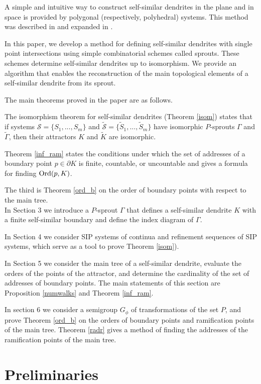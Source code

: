 \documentclass[11pt,reqno]{amsart}
\newcommand{\eS}{{\mathcal S}}
\begin{document}
A simple and intuitive way to construct self-similar dendrites in the plane and in space is provided by polygonal (respectively, polyhedral) systems.
This method was described in \cite{STV} and expanded in \cite{Adam}. 


In this paper, we develop a method for defining self-similar dendrites with single point intersections using simple combinatorial schemes called sprouts. These schemes determine self-similar dendrites up to isomorphism. We provide an algorithm that enables the reconstruction of the main topological elements of a self-similar dendrite from its sprout.


The main theorems proved in the paper are as follows.

The isomorphism theorem for self-similar dendrites (Theorem \ref{isom}) states that  if systems ${\eS}=\{S_1,...,S_m\}$ and $\tilde {\eS}=\{\tilde S_1,...,\tilde S_m\}$ have isomorphic $P$-sprouts $\Gamma$ and $\tilde \Gamma$, then their attractors $K$ and $ \tilde K$ are isomorphic. 

Theorem \ref{inf_ram} states the conditions under which  the  set of addresses of a boundary point $p\in \partial K$ is finite, countable, or uncountable and gives a formula for finding  ${\rm Ord}(p,K)$.


The third is  Theorem \ref{ord_b}   on the order of boundary points with respect to the main tree. \\ 

In Section 3 we introduce a $P$-sprout $\Gamma$ that defines a self-similar dendrite $K$ with a finite self-similar boundary and  define the index diagram of $\Gamma$.

In Section 4 we consider   SIP systems of continua and refinement sequences of SIP systems, which serve as a tool to prove  Theorem \ref{isom}).

In Section 5 we consider the main tree of a self-similar dendrite, evaluate the orders of the points of the attractor, and determine the cardinality of the set of addresses of  boundary points. The main statements of this section are Proposition \ref{numwalks} and Theorem \ref{inf_ram}.

In section 6 we consider a semigroup $G_\phi $ of  transformations of the set $P$, and prove  Theorem \ref{ord_b} on the orders of boundary points and ramification points of the main tree. Theorem \ref{radr}
gives a method of finding the addresses of the ramification points of the main tree.

\section{Preliminaries}
\end{document}
